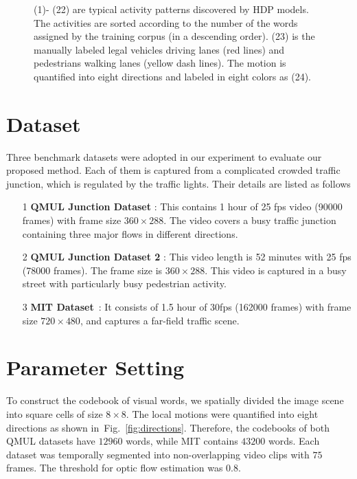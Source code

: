 \begin{figure}[!htbp]
	\caption[Typical activities in QMUL Junction Dataset]
	{(1)- (22) are typical activity patterns discovered by HDP models. The activities are sorted according to the number of the words assigned by the training corpus (in a descending order). (23) is the manually labeled legal vehicles driving lanes (red lines) and pedestrians walking lanes (yellow dash lines). The motion is quantified into eight directions and labeled in eight colors as (24).}
	\label{qmul_activity}
\end{figure}



\section{Dataset}
\label{dataset}
Three benchmark datasets were adopted in our experiment to evaluate our proposed method. Each of them is captured from a complicated crowded traffic junction, which is regulated by the traffic lights. Their details are listed as follows
\begin{itemize}
	\item[1]\textbf{QMUL Junction Dataset} \cite{hospedales2009markov}: This contains 1 hour of 25 fps video (90000 frames) with frame size $360\times288$. The video covers a busy traffic junction containing three major flows in different directions. 
	\item[2]\textbf{QMUL Junction Dataset 2} \cite{hospedales2009markov}: This video length is 52 minutes with 25 fps (78000 frames). The frame size is $360\times288$. This video is captured in a busy street with particularly busy pedestrian activity. 
	\item[3]\textbf{MIT Dataset}~\cite{wang2009unsupervised}: It consists of 1.5 hour of 30fps (162000 frames) with frame size $720\times 480$, and captures a far-field traffic scene.
\end{itemize}

\section{Parameter Setting}
\label{parameter}
To construct the codebook of visual words, we spatially divided the image scene into square cells of size $8\times8$. 
The local motions were quantified into eight directions as shown in~Fig.~\ref{fig:directions}. Therefore, the codebooks of both QMUL datasets have $12960$ words, while MIT contains $43200$ words. Each dataset was temporally segmented into non-overlapping video clips with $75$ frames. The threshold for optic flow estimation was 0.8.

